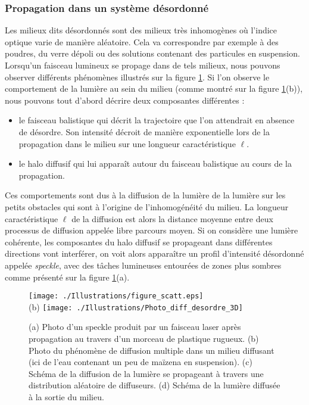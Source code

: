 \documentclass[a4paper,11pt]{article} %
\begin{document}
	\subsubsection{Propagation dans un système désordonné}
	
	Les milieux dits désordonnés sont des milieux très inhomogènes où l'indice optique varie de manière aléatoire. Cela va correspondre par exemple à des poudres, du verre dépoli ou des solutions contenant des particules en suspension. Lorsqu'un faisceau lumineux se propage dans de tels milieux, nous pouvons observer différents phénomènes illustrés sur la figure \ref{fig:diffusion_desordre_3D}. Si l'on observe le comportement de la lumière au sein du milieu (comme montré sur la figure \ref{fig:diffusion_desordre_3D}(b)), nous pouvons tout d'abord décrire deux  composantes différentes :
	\begin{itemize}
		\item le faisceau balistique qui décrit la trajectoire que l'on attendrait en absence de désordre. Son intensité décroit de manière exponentielle lors de la propagation dans le milieu sur une longueur caractéristique $\ell$.
		\item le halo diffusif qui lui apparaît autour du faisceau balistique au cours de la propagation.
	\end{itemize}
	Ces comportements sont dus à la diffusion de la lumière de la lumière sur les petits obstacles qui sont à l'origine de l'inhomogénéité du milieu. La longueur caractéristique $\ell$ de la diffusion est alors la distance moyenne entre deux processus de diffusion appelée libre parcours moyen. Si on considère une lumière cohérente, les composantes du halo diffusif se propageant dans différentes directions vont interférer, on voit alors apparaître un profil d'intensité désordonné appelée \textit{speckle}, avec des tâches lumineuses entourées de zones plus sombres comme présenté sur la figure \ref{fig:diffusion_desordre_3D}(a).\\
	
	\begin{figure}[h]
		\centering
		\begin{minipage}[c]{0.85\linewidth}
			\centering
			\texttt{[image: ./Illustrations/figure\_scatt.eps]} \\
			(b) \hspace{0.1cm} \texttt{[image: ./Illustrations/Photo\_diff\_desordre\_3D]}
			\caption{(a) Photo d'un speckle produit par un faisceau laser après propagation au travers d'un morceau de plastique rugueux. (b) Photo du phénomène de diffusion multiple dans un milieu diffusant (ici de l'eau contenant un peu de maïzena en suspension). (c) Schéma de la diffusion de la lumière se propageant à travers une distribution aléatoire de diffuseurs. (d) Schéma de la lumière diffusée à la sortie du milieu.}
			\label{fig:diffusion_desordre_3D}
		\end{minipage}
	\end{figure}	
	
\end{document}
